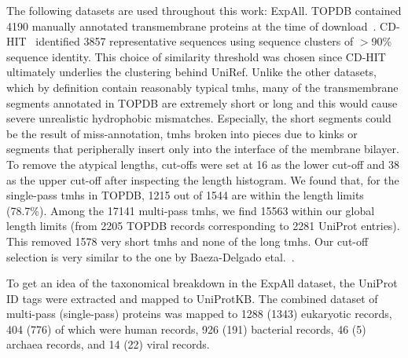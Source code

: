 The following datasets are used throughout this work:
ExpAll.
TOPDB contained 4190 manually annotated transmembrane proteins at the time of download~\cite{Dobson2015}.
CD-HIT~\cite{Huang2010} identified 3857 representative sequences using sequence clusters of $>$90\% sequence identity.
This choice of similarity threshold was chosen since CD-HIT ultimately underlies the clustering behind UniRef.
Unlike the other datasets, which by definition contain reasonably typical \gls{tmh}s, many of the transmembrane segments annotated in TOPDB are extremely short or long and this would cause severe unrealistic hydrophobic mismatches.
Especially, the short segments could be the result of miss-annotation, \gls{tmh}s broken into pieces due to kinks or segments that peripherally insert only into the interface of the membrane bilayer.
To remove the atypical lengths, cut-offs were set at 16 as the lower cut-off and 38 as the upper cut-off after inspecting the length histogram.
We found that, for the single-pass \gls{tmh}s in TOPDB, 1215 out of 1544 are within the length limits (78.7\%).
Among the 17141 multi-pass \gls{tmh}s, we find 15563 within our global length limits (from 2205 TOPDB records corresponding to 2281 UniProt entries).
This removed 1578 very short \gls{tmh}s and none of the long \gls{tmh}s.
Our cut-off selection is very similar to the one by Baeza-Delgado etal.~\cite{Baeza-Delgado2013}.

To get an idea of the taxonomical breakdown in the ExpAll dataset, the UniProt ID tags were extracted and mapped to UniProtKB.
The combined dataset of multi-pass (single-pass) proteins was mapped to 1288 (1343) eukaryotic records, 404 (776) of which were human records, 926 (191) bacterial records, 46 (5) archaea records, and 14 (22) viral records.



